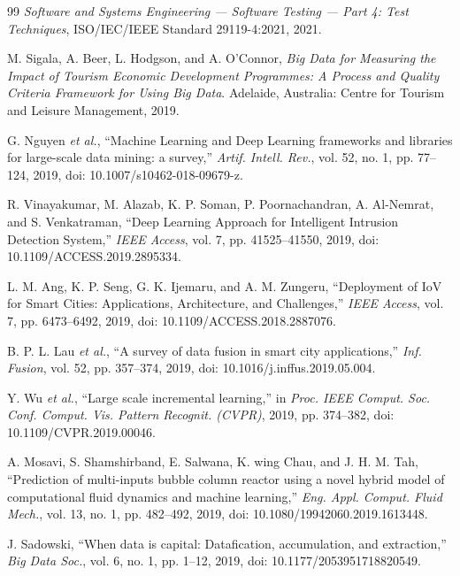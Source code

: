 \documentclass[10pt,a4paper]{article}
\begin{document}
\begin{thebibliography}{99}
\textit{Software and Systems Engineering --- Software Testing --- Part 4: Test Techniques}, ISO/IEC/IEEE Standard 29119-4:2021, 2021.

M. Sigala, A. Beer, L. Hodgson, and A. O'Connor, \textit{Big Data for Measuring the Impact of Tourism Economic Development Programmes: A Process and Quality Criteria Framework for Using Big Data}. Adelaide, Australia: Centre for Tourism and Leisure Management, 2019.

G. Nguyen \textit{et al.}, ``Machine Learning and Deep Learning frameworks and libraries for large-scale data mining: a survey,'' \textit{Artif. Intell. Rev.}, vol. 52, no. 1, pp. 77--124, 2019, doi: 10.1007/s10462-018-09679-z.

R. Vinayakumar, M. Alazab, K. P. Soman, P. Poornachandran, A. Al-Nemrat, and S. Venkatraman, ``Deep Learning Approach for Intelligent Intrusion Detection System,'' \textit{IEEE Access}, vol. 7, pp. 41525--41550, 2019, doi: 10.1109/ACCESS.2019.2895334.

L. M. Ang, K. P. Seng, G. K. Ijemaru, and A. M. Zungeru, ``Deployment of IoV for Smart Cities: Applications, Architecture, and Challenges,'' \textit{IEEE Access}, vol. 7, pp. 6473--6492, 2019, doi: 10.1109/ACCESS.2018.2887076.

B. P. L. Lau \textit{et al.}, ``A survey of data fusion in smart city applications,'' \textit{Inf. Fusion}, vol. 52, pp. 357--374, 2019, doi: 10.1016/j.inffus.2019.05.004.

Y. Wu \textit{et al.}, ``Large scale incremental learning,'' in \textit{Proc. IEEE Comput. Soc. Conf. Comput. Vis. Pattern Recognit. (CVPR)}, 2019, pp. 374--382, doi: 10.1109/CVPR.2019.00046.

A. Mosavi, S. Shamshirband, E. Salwana, K. wing Chau, and J. H. M. Tah, ``Prediction of multi-inputs bubble column reactor using a novel hybrid model of computational fluid dynamics and machine learning,'' \textit{Eng. Appl. Comput. Fluid Mech.}, vol. 13, no. 1, pp. 482--492, 2019, doi: 10.1080/19942060.2019.1613448.

J. Sadowski, ``When data is capital: Datafication, accumulation, and extraction,'' \textit{Big Data Soc.}, vol. 6, no. 1, pp. 1--12, 2019, doi: 10.1177/2053951718820549.

\end{thebibliography}
\end{document}
